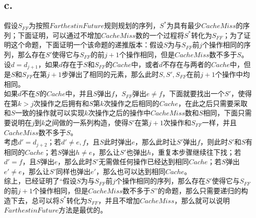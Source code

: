 \documentclass[12pt]{article}
\begin{document}
    \subsection*{c.}
        假设$S_{FF}$为按照$Farthest in Future$规则规划的序列，$S^*$为具有最少$Cache Miss$的序列；下面证明，可以通过不增加$Cache Miss$数的一个过程将$S^*$转化为$S_{FF}$；为了证明这个命题，下面证明一个该命题的递推版本：假设$S$为与$S_{FF}$前$j$个操作相同的序列，那么存在$S'$使得它与$S_{FF}$的前$j+1$个操作相同，但是$Cache Miss$数不多于$S$。\\
        设$d=d_{j+1}$，如果$d$存在于$S$和$S_{FF}$的$Cache$中，或者$d$不存在与两者的$Cache$中，但是$S$和$S_{FF}$在第$j+1$步弹出了相同的元素，那么此时$S,S',S_{FF}$在前$j+1$个操作中均相同。\\
        如果$d$不在$S$的$Cache$中，并且$S$弹出$f$，$S_{FF}$弹出$e \neq f$，下面就要找出一个$S'$，使得在第$k>j$次操作之后拥有和$S$第$k$次操作之后相同的$Cache$，在此之后只需要采取和$S$一致的操作就可以实现$k$次操作之后的操作中$Cache Miss$数和$S$相同，下面只需要说明在$j$到$k$之间做的一系列构造，使得$S'$在第$j+1$次操作和$S_{FF}$一样，并且$Cache Miss$数不多于$S$。\\
        考虑$d'=d_{j+2}$；若$d'\neq e,f$，且$S$此时弹出$e$，那么此时让$S'$弹出$f$，则此时$S'$和$S$有相同的$Cache$；若$S$弹出$h \neq e$，那么让$S'$也弹出$h$，重复本步骤继续往下找；若$d'=f$，且$S$弹出$e$，那么此时$S'$无需做任何操作已经达到相同$Cache$；若$S$弹出$e' \neq e$，那么让$S'$同样也弹出$e'$，那么也可以达到相同$Cache$。\\
        综上，已经证明了“假设$S$为与$S_{FF}$前$j$个操作相同的序列，那么存在$S'$使得它与$S_{FF}$的前$j+1$个操作相同，但是$Cache Miss$数不多于$S$”的命题，那么只需要递归的构造下去，总可以将$S^*$转化为$S_{FF}$，并且不增加$Cache Miss$，那么就可以说明$Farthest in Future$方法是最优的。
\end{document}
